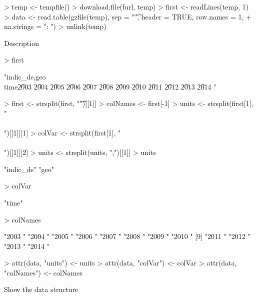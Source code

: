 \documentclass[a4paper,12pt]{article}\usepackage[]{graphicx}\usepackage[]{color}
\begin{document}
\begin{Schunk}
\begin{Sinput}
> temp <- tempfile()
> download.file(furl, temp)
> first <- readLines(temp, 1)
> data <- read.table(gzfile(temp), sep = "\t", header = TRUE, row.names = 1, 
+     na.strings = ": ")
> unlink(temp)
\end{Sinput}
\end{Schunk}

Description

\begin{Schunk}
\begin{Sinput}
> first
\end{Sinput}
\begin{Soutput}
[1] "indic_de,geo\\time\t2003 \t2004 \t2005 \t2006 \t2007 \t2008 \t2009 \t2010 \t2011 \t2012 \t2013 \t2014 "
\end{Soutput}
\begin{Sinput}
> first <- strsplit(first, "\t")[[1]]
> colNames <- first[-1]
> units <- strsplit(first[1], "\\\\")[[1]][1]
> colVar <- strsplit(first[1], "\\\\")[[1]][2]
> units <- strsplit(units, ",")[[1]]
> units
\end{Sinput}
\begin{Soutput}
[1] "indic_de" "geo"     
\end{Soutput}
\begin{Sinput}
> colVar
\end{Sinput}
\begin{Soutput}
[1] "time"
\end{Soutput}
\begin{Sinput}
> colNames
\end{Sinput}
\begin{Soutput}
 [1] "2003 " "2004 " "2005 " "2006 " "2007 " "2008 " "2009 " "2010 "
 [9] "2011 " "2012 " "2013 " "2014 "
\end{Soutput}
\begin{Sinput}
> attr(data, "units") <- units
> attr(data, "colVar") <- colVar
> attr(data, "colNames") <- colNames
\end{Sinput}
\end{Schunk}
Show the data structure
\end{document}
